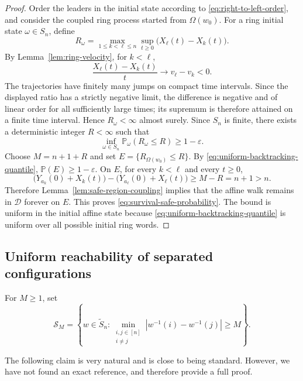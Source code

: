 \documentclass[11pt,a4paper]{amsart}
\theoremstyle{definition}
\theoremstyle{remark}
\numberwithin{equation}{section}
\newcommand{\Pp}{\mathbb P}
\newcommand{\wtS}{\widetilde S_n}
\newcommand{\cD}{\mathcal D}
\newcommand{\cS}{\mathcal S}
\newcommand{\abs}[1]{\left|#1\right|}
\begin{document}
	\begin{proof}
		Order the leaders in the initial state according to \eqref{eq:right-to-left-order}, and consider
		the coupled ring process started from $\Omega(w_0)$.  For a ring initial
		state $\omega\in S_n$, define
		\begin{equation}\label{eq:ring-backtracking-variable}
			R_\omega=
			\max_{1\le k<\ell\le n}
			\sup_{t\ge0}\bigl(X_\ell(t)-X_k(t)\bigr).
		\end{equation}
		By Lemma~\ref{lem:ring-velocity}, for $k<\ell$,
		\[
		\frac{X_\ell(t)-X_k(t)}{t}\longrightarrow v_\ell-v_k<0.
		\]
		The trajectories have finitely many jumps on compact time intervals.  Since
		the displayed ratio has a strictly negative limit, the difference is
		negative and of linear order for all sufficiently large times; its supremum
		is therefore attained on a finite time interval.  Hence
		$R_\omega<\infty$ almost surely.  Since $S_n$ is finite, there exists a
		deterministic integer $R<\infty$ such that
		\begin{equation}\label{eq:uniform-backtracking-quantile}
			\inf_{\omega\in S_n}\Pp_\omega(R_\omega\le R)
			\ge1-\varepsilon.
		\end{equation}
		Choose $M=n+1+R$ and set $E=\{R_{\Omega(w_0)}\le R\}$. By
		\eqref{eq:uniform-backtracking-quantile}, $\Pp(E)\ge1-\varepsilon$.
		On $E$, for every $k<\ell$ and every $t\ge0$,
		\[
		\bigl(Y_{a_k}(0)+X_k(t)\bigr)
		-\bigl(Y_{a_\ell}(0)+X_\ell(t)\bigr)
		\ge M-R=n+1>n.
		\]
		Therefore Lemma~\ref{lem:safe-region-coupling} implies that the affine walk
		remains in $\cD$ forever on $E$. This proves
		\eqref{eq:survival-safe-probability}. The bound is uniform in the initial
		affine state because \eqref{eq:uniform-backtracking-quantile} is uniform
		over all possible initial ring words.
	\end{proof}
	
	\subsection{Uniform reachability of separated configurations}
	\label{subsec:uniform-reachability}
	
	For $M\ge1$, set
	\begin{equation}\label{eq:SM-definition}
		\cS_M=\left\{w\in\wtS:
		\min_{\substack{i,j\in[n]\\i\ne j}}
		\abs{w^{-1}(i)-w^{-1}(j)}\ge M\right\}.
	\end{equation}
	
	The following claim is very natural and is close to being standard. However, we have not found an exact reference, and therefore provide a full proof. 
	
\end{document}

